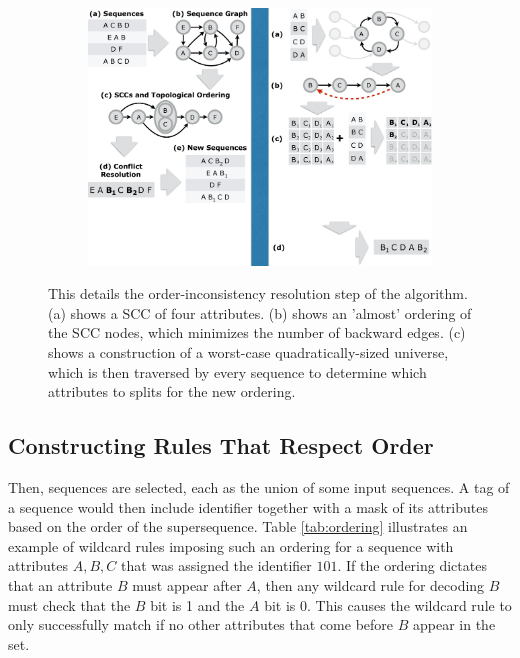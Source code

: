 \begin{figure}[t!] 
\begin{minipage}{1\linewidth}
\begin{subfigure}[c]{0.96\linewidth}
\includegraphics[trim={19.2cm 10cm 0 0}, clip, width=\linewidth]{figures/partial_ordering}
\end{subfigure} 
\end{minipage} 
\caption{This details the order-inconsistency resolution step of the algorithm. (a) shows a SCC of four attributes. (b) shows an 'almost' ordering of the SCC nodes, which minimizes the number of backward edges. (c) shows a  construction of a worst-case quadratically-sized universe, which is then traversed by every sequence to determine which attributes to splits for the new ordering.}
\label{fig:conflict_res}
\end{figure}

\subsection{Constructing Rules That Respect Order}
\label{s:order-rules}
Then, sequences are selected, each as the union of some input sequences. A tag of a sequence would then include identifier together with a mask of its attributes based on the order of the supersequence.  Table \ref{tab:ordering} illustrates an example of wildcard rules imposing such an ordering for a sequence with attributes $A, B, C$ that was assigned the identifier $101$.  If the ordering dictates that an attribute $B$ must appear after $A$, then any wildcard rule for decoding $B$ must check that the $B$ bit is 1 and the $A$ bit is 0. This causes the wildcard rule to only successfully match if no other attributes that come before $B$ appear in the set. %


